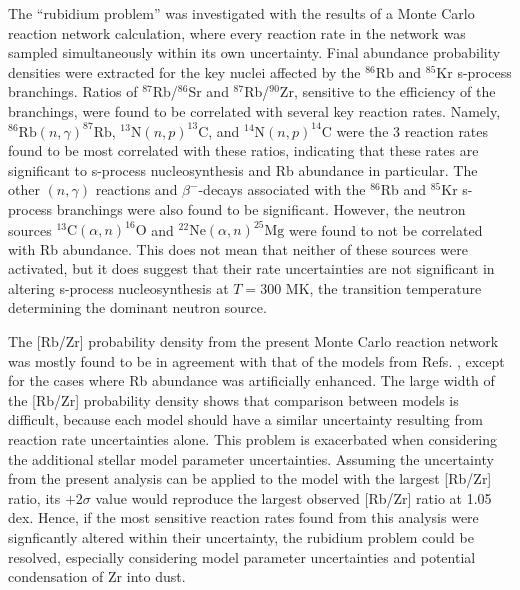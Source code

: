 The ``rubidium problem'' was investigated with the results of a Monte Carlo reaction network calculation, where every reaction rate in the network was sampled simultaneously within its own uncertainty. Final abundance probability densities were extracted for the key nuclei affected by the $^{86}$Rb and $^{85}$Kr s-process branchings. Ratios of $^{87}$Rb/$^{86}$Sr and $^{87}$Rb/$^{90}$Zr, sensitive to the efficiency of the branchings, were found to be correlated with several key reaction rates. Namely, $^{86}\mathrm{Rb}(n,\gamma)^{87}\mathrm{Rb}$, $^{13}\mathrm{N}(n,p)^{13}\mathrm{C}$, and $^{14}\mathrm{N}(n,p)^{14}\mathrm{C}$ were the 3 reaction rates found to be most correlated with these ratios, indicating that these rates are significant to s-process nucleosynthesis and Rb abundance in particular. The other $(n,\gamma)$ reactions and $\beta^{-}$-decays associated with the $^{86}$Rb and $^{85}$Kr s-process branchings were also found to be significant. However, the neutron sources $^{13}\mathrm{C}(\alpha,n)^{16}\mathrm{O}$ and $^{22}\mathrm{Ne}(\alpha,n)^{25}\mathrm{Mg}$ were found to not be correlated with Rb abundance. This does not mean that neither of these sources were activated, but it does suggest that their rate uncertainties are not significant in altering s-process nucleosynthesis at $T = 300$ MK, the transition temperature determining the dominant neutron source.

The [Rb/Zr] probability density from the present Monte Carlo reaction network was mostly found to be in agreement with that of the models from Refs. \cite{Karakas2012,Raai2012,Karakas2016,Pignatari2016}, except for the cases where Rb abundance was artificially enhanced. The large width of the [Rb/Zr] probability density shows that comparison between models is difficult, because each model should have a similar uncertainty resulting from reaction rate uncertainties alone. This problem is exacerbated when considering the additional stellar model parameter uncertainties. Assuming the uncertainty from the present analysis can be applied to the model with the largest [Rb/Zr] ratio, its $+2\sigma$ value would reproduce the largest observed [Rb/Zr] ratio at 1.05 dex. Hence, if the most sensitive reaction rates found from this analysis were signficantly altered within their uncertainty, the rubidium problem could be resolved, especially considering model parameter uncertainties and potential condensation of Zr into dust.


